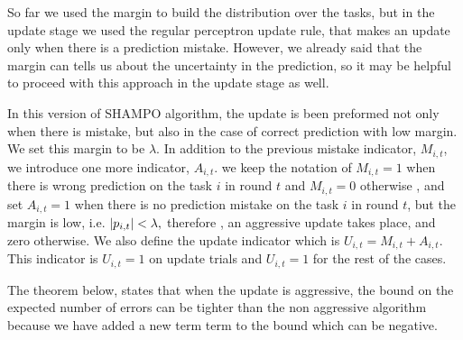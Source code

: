 So far we used the margin to build the distribution over the tasks,  but in the update stage we used the regular perceptron update rule, that makes an update only when there is a prediction mistake. However, we already said that the margin can tells us about the uncertainty in the prediction, so it may be helpful to proceed with this approach in the update stage as well. 

In this  version of SHAMPO algorithm, the update is been preformed not only when there is mistake, but also in the case of correct prediction with low margin. We set this margin to be $\lambda$. In addition to the previous mistake indicator, $M_{i,t}$,  we introduce one more  indicator,   $A_{i,t}$. we keep the notation of  $M_{i,t}=1$ when there is wrong prediction on the task $i$ in round $t$ and $M_{i,t}=0$ otherwise ,  and set $A_{i,t}=1$ when there is no prediction mistake on the task $i$ in round $t$, but the margin is low, i.e. $\left\vert{p_{i,t}}\right\vert<\lambda,$ therefore , an aggressive update takes place, and zero otherwise. We  also define the update indicator which is $U_{i,t}=M_{i,t}+A_{i,t}$. This indicator is  $U_{i,t}=1$ on update trials and  $U_{i,t}=1$ for the rest of the cases.

The theorem below, states that when the update is aggressive, the bound on the expected number of errors can be tighter than the non aggressive algorithm because we have added a new term term to the bound which can be negative.     


